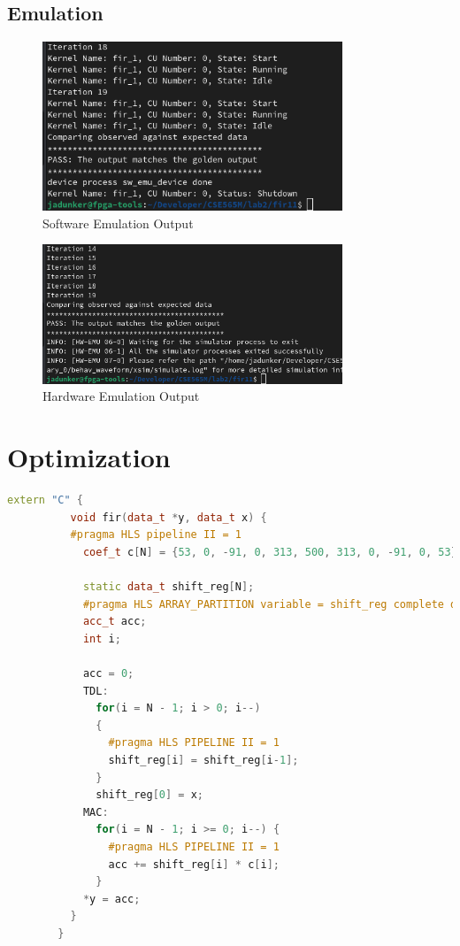 \documentclass[11pt]{article}
\begin{document}
      \subsection{Emulation}
      \begin{figure}[h]
        \centering
        \includegraphics[width=0.8\textwidth]{baseline_sw_emu.png}
        \caption{Software Emulation Output}
        \label{fig:bl_sw_emu_out}
      \end{figure}
      \begin{figure}[h]
        \centering
        \includegraphics[width=0.8\textwidth]{baseline_hw_emu_2.png}
        \caption{Hardware Emulation Output}
        \label{fig:bl_hw_emu_out}
      \end{figure}
    
    \pagebreak[3]
    \section{Optimization}
      \begin{lstlisting}[style=HLSstyle, language=C++]
        extern "C" {
          void fir(data_t *y, data_t x) {
          #pragma HLS pipeline II = 1
            coef_t c[N] = {53, 0, -91, 0, 313, 500, 313, 0, -91, 0, 53};

            static data_t shift_reg[N];
            #pragma HLS ARRAY_PARTITION variable = shift_reg complete dim = 0
            acc_t acc;
            int i;

            acc = 0;
            TDL:
              for(i = N - 1; i > 0; i--)
              {
                #pragma HLS PIPELINE II = 1
                shift_reg[i] = shift_reg[i-1];
              }
              shift_reg[0] = x;
            MAC:
              for(i = N - 1; i >= 0; i--) {
                #pragma HLS PIPELINE II = 1
                acc += shift_reg[i] * c[i];
              }
            *y = acc;
          }
        }
      \end{lstlisting}
      \pagebreak[3]
\end{document}
